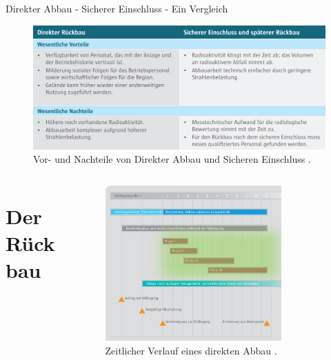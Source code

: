 \begin{frame}{ Direkter Abbau - Sicherer Einschluss - Ein Vergleich}
  \begin{figure}
     \centering
     \includegraphics[width=1\textwidth]{./bilder/vor_nachteile_direkter_einschluss.PNG}
     \caption{ Vor- und Nachteile von Direkter Abbau und Sicheren Einschluss \cite{stilllegung_grs}. }
     \label{ fig: karte_abschaltungen }
   \end{figure}
\end{frame}



\begin{frame}
  \begin{columns}

      \begin{column}{0.2\textwidth}
        \section{Der Rückbau}
      \end{column}

      \begin{column}{0.78\textwidth}
        \begin{figure}
          \centering
          \includegraphics[width=0.8\textwidth]{./bilder/stillegung_phasen.png}
          \caption{ Zeitlicher Verlauf eines direkten Abbau \cite{stilllegung_grs}. }
          \label{ fig: stillegung }
        \end{figure}
      \end{column}

  \end{columns}
\end{frame}



